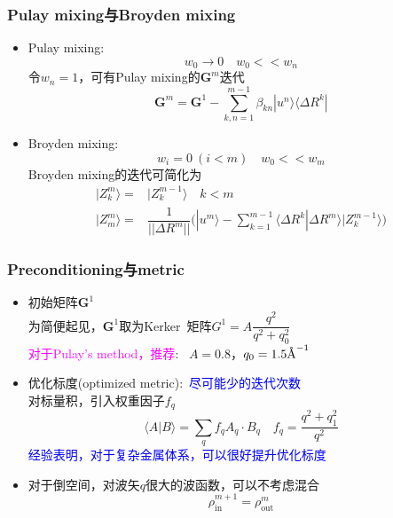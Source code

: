 \documentclass[cjk,slidestop,compress,mathserif,blue]{beamer}
\begin{document}
  \frame
  {
	  \frametitle{\textrm{Pulay mixing}与\textrm{Broyden mixing}}
	  \begin{itemize}
		  \item \textrm{Pulay mixing}:
			  \begin{displaymath}
				  w_0\rightarrow0\quad w_0<<w_n
			  \end{displaymath}
			  令$w_n=1$，可有\textrm{Pulay mixing}的$\mathbf G^m$迭代
			  \begin{displaymath}
				  \mathbf{G}^m=\mathbf{G}^1-\sum_{k,n=1}^{m-1}\beta_{kn}|u^n\rangle\langle\Delta R^k|
			  \end{displaymath}
		  \item \textrm{Broyden mixing}:
			  \begin{displaymath}
				  w_i=0~(i<m)\quad w_0<<w_m
			  \end{displaymath}
			  \textrm{Broyden mixing}的迭代可简化为
			  \begin{displaymath}
				  \begin{aligned}
					  |Z_k^m\rangle=&|Z_k^{m-1}\rangle\quad k<m\\
					  |Z_m^m\rangle=&\dfrac1{||\Delta R^m||}\bigg(|u^m\rangle-\sum_{k=1}^{m-1}\langle\Delta R^k|\Delta R^m\rangle|Z_k^{m-1}\rangle\bigg)
				  \end{aligned}
			  \end{displaymath}
	  \end{itemize}
  }

  \frame
  {
	  \frametitle{\textrm{Preconditioning}与\textrm{metric}}
	  \begin{itemize}
		  \item 初始矩阵$\mathbf{G}^1$\\
			  为简便起见，$\mathbf{G}^1$取为\textrm{Kerker~}矩阵$G^1=A\dfrac{q^2}{q^2+q_0^2}$
	  		\\\textcolor{magenta}{对于\textrm{Pulay's method}，推荐}:~
			$A=0.8$，$q_0=1.5\mbox{\textrm{\AA}}^{-1}$
		  \item 优化标度(\textrm{optimized metric}):~\textcolor{blue}{尽可能少的迭代次数}\\
			  对标量积，引入权重因子$f_q$
			  \begin{displaymath}
				  \langle A|B\rangle=\sum_qf_qA_q\cdot B_q\quad f_q=\dfrac{q^2+q_1^2}{q^2}
			  \end{displaymath}
			  \textcolor{blue}{经验表明，对于复杂金属体系，可以很好提升优化标度}
		  \item 对于倒空间，对波矢$q$很大的波函数，可以不考虑混合
			  \begin{displaymath}
				  \rho_{\mathrm{in}}^{m+1}=\rho_{\mathrm{out}}^{m}
			  \end{displaymath}
	  \end{itemize}
  }
\end{document}
